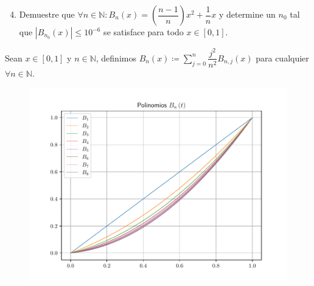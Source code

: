 \begin{frame}
	\begin{enumerate}\setcounter{enumi}{3}
		\item

		      Demuestre que
		      \begin{math}
			      \forall n\in\mathbb{N}:
			      B_{n}\left(x\right)=
			      \left(\dfrac{n-1}{n}\right)x^{2}+
			      \dfrac{1}{n}x
		      \end{math}
		      y determine un $n_{0}$ tal que
		      \begin{math}
			      \left|
			      B_{n_{0}}\left(x\right)
			      \right|\leq
			      10^{-6}
		      \end{math}
		      se satisface para todo $x\in\left[0,1\right]$.
	\end{enumerate}

	\begin{solution}
		Sean $x\in\left[0,1\right]$ y $n\in\mathbb{N}$, definimos
		\begin{math}
			B_{n}\left(x\right)\coloneqq
			\sum\limits_{j=0}^{n}
			\dfrac{j^{2}}{n^{2}}
			B_{n,j}\left(x\right)
		\end{math}
		para cualquier
		\begin{math}
			\forall n\in\mathbb{N}
		\end{math}.

		\begin{figure}[ht!]
			\centering
			\includegraphics[width=.5\paperwidth]{b_n}
		\end{figure}
	\end{solution}
\end{frame}

